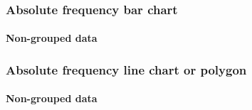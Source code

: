 \begin{frame}
\frametitle{Absolute frequency bar chart}
\framesubtitle{Non-grouped data}
\begin{center}
\scalebox{0.5}{} 
\end{center}
\end{frame}


\begin{frame}
\frametitle{Absolute frequency line chart or polygon}
\framesubtitle{Non-grouped data}
\begin{center}
\scalebox{0.5}{} 
\end{center}
\end{frame}

